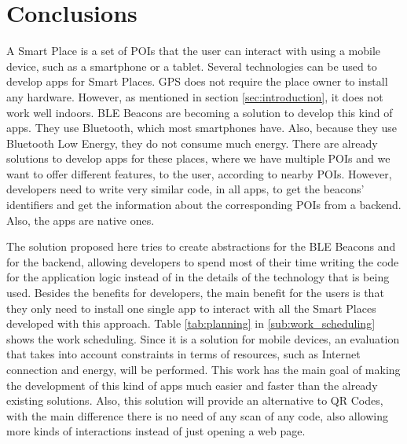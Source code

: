 
%
%

\section{Conclusions}
\label{sec:conclusions}
A Smart Place is a set of POIs that the user can interact
with using a mobile device, such as a smartphone or a tablet.
Several technologies can be used to develop apps for
Smart Places. GPS does not require the place owner to
install any hardware. However, as mentioned in 
section \ref{sec:introduction}, it does not work well
indoors. BLE Beacons are becoming a solution to
develop this kind of apps. They use Bluetooth,
which most smartphones have. Also, because they use
Bluetooth Low Energy, they do not consume much energy.
There are already solutions to develop apps for these
places, where we have multiple POIs and we want to
offer different features, to the user, according
to nearby POIs. However, developers need
to write very similar code, in all apps, to
get the beacons' identifiers and get the information
about the corresponding POIs from a backend.
Also, the apps are native ones.

The solution proposed here tries to create abstractions
for the BLE Beacons and for the backend, allowing
developers to spend most of their time writing the
code for the application logic
instead of in the details of the technology that is
being used. Besides the benefits for developers,
the main benefit for the users is that they only need
to install one single app to interact with all
the Smart Places developed with this approach.
Table \ref{tab:planning}
in \ref{sub:work_scheduling} shows the work scheduling.
Since it is a solution for mobile devices, an evaluation
that takes into account constraints in terms of resources,
such as Internet connection and energy, will be performed.
This work has the main goal of making the development
of this kind of apps much easier and faster than
the already existing solutions. Also, this solution
will provide an alternative
to QR Codes, with the main difference there is no need of
any scan of any code, also allowing more kinds of interactions
instead of just opening a web page. 
